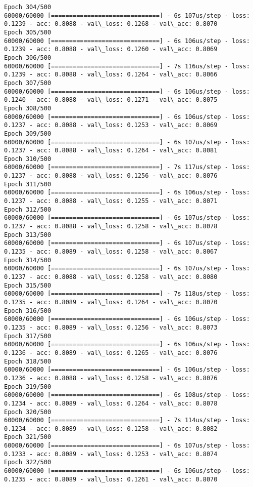 \documentclass[11pt]{article}
\begin{document}
\begin{Verbatim}[commandchars=\\\{\}]
Epoch 304/500
60000/60000 [==============================] - 6s 107us/step - loss: 0.1239 - acc: 0.8088 - val\_loss: 0.1268 - val\_acc: 0.8070
Epoch 305/500
60000/60000 [==============================] - 6s 106us/step - loss: 0.1239 - acc: 0.8088 - val\_loss: 0.1260 - val\_acc: 0.8069
Epoch 306/500
60000/60000 [==============================] - 7s 116us/step - loss: 0.1239 - acc: 0.8088 - val\_loss: 0.1264 - val\_acc: 0.8066
Epoch 307/500
60000/60000 [==============================] - 6s 106us/step - loss: 0.1240 - acc: 0.8088 - val\_loss: 0.1271 - val\_acc: 0.8075
Epoch 308/500
60000/60000 [==============================] - 6s 106us/step - loss: 0.1237 - acc: 0.8088 - val\_loss: 0.1253 - val\_acc: 0.8069
Epoch 309/500
60000/60000 [==============================] - 6s 107us/step - loss: 0.1237 - acc: 0.8088 - val\_loss: 0.1264 - val\_acc: 0.8081
Epoch 310/500
60000/60000 [==============================] - 7s 117us/step - loss: 0.1237 - acc: 0.8088 - val\_loss: 0.1256 - val\_acc: 0.8076
Epoch 311/500
60000/60000 [==============================] - 6s 106us/step - loss: 0.1237 - acc: 0.8088 - val\_loss: 0.1255 - val\_acc: 0.8071
Epoch 312/500
60000/60000 [==============================] - 6s 107us/step - loss: 0.1237 - acc: 0.8088 - val\_loss: 0.1258 - val\_acc: 0.8078
Epoch 313/500
60000/60000 [==============================] - 6s 107us/step - loss: 0.1235 - acc: 0.8089 - val\_loss: 0.1258 - val\_acc: 0.8067
Epoch 314/500
60000/60000 [==============================] - 6s 107us/step - loss: 0.1237 - acc: 0.8088 - val\_loss: 0.1258 - val\_acc: 0.8080
Epoch 315/500
60000/60000 [==============================] - 7s 118us/step - loss: 0.1235 - acc: 0.8089 - val\_loss: 0.1264 - val\_acc: 0.8070
Epoch 316/500
60000/60000 [==============================] - 6s 106us/step - loss: 0.1235 - acc: 0.8089 - val\_loss: 0.1256 - val\_acc: 0.8073
Epoch 317/500
60000/60000 [==============================] - 6s 106us/step - loss: 0.1236 - acc: 0.8089 - val\_loss: 0.1265 - val\_acc: 0.8076
Epoch 318/500
60000/60000 [==============================] - 6s 106us/step - loss: 0.1236 - acc: 0.8088 - val\_loss: 0.1258 - val\_acc: 0.8076
Epoch 319/500
60000/60000 [==============================] - 6s 108us/step - loss: 0.1234 - acc: 0.8089 - val\_loss: 0.1264 - val\_acc: 0.8078
Epoch 320/500
60000/60000 [==============================] - 7s 114us/step - loss: 0.1234 - acc: 0.8089 - val\_loss: 0.1258 - val\_acc: 0.8082
Epoch 321/500
60000/60000 [==============================] - 6s 107us/step - loss: 0.1233 - acc: 0.8089 - val\_loss: 0.1253 - val\_acc: 0.8074
Epoch 322/500
60000/60000 [==============================] - 6s 106us/step - loss: 0.1235 - acc: 0.8089 - val\_loss: 0.1261 - val\_acc: 0.8070

\end{Verbatim}
\end{document}
